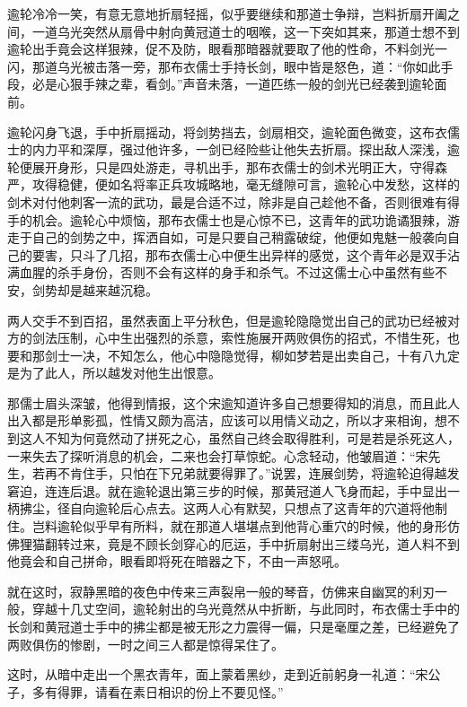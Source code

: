 逾轮冷冷一笑，有意无意地折扇轻摇，似乎要继续和那道士争辩，岂料折扇开阖之间，一道乌光突然从扇骨中射向黄冠道士的咽喉，这一下突如其来，那道士想不到逾轮出手竟会这样狠辣，促不及防，眼看那暗器就要取了他的性命，不料剑光一闪，那道乌光被击落一旁，那布衣儒士手持长剑，眼中皆是怒色，道：“你如此手段，必是心狠手辣之辈，看剑。”声音未落，一道匹练一般的剑光已经袭到逾轮面前。

逾轮闪身飞退，手中折扇摇动，将剑势挡去，剑扇相交，逾轮面色微变，这布衣儒士的内力平和深厚，强过他许多，一剑已经险些让他失去折扇。探出敌人深浅，逾轮便展开身形，只是四处游走，寻机出手，那布衣儒士的剑术光明正大，守得森严，攻得稳健，便如名将率正兵攻城略地，毫无缝隙可言，逾轮心中发愁，这样的剑术对付他刺客一流的武功，最是合适不过，除非是自己趁他不备，否则很难有得手的机会。逾轮心中烦恼，那布衣儒士也是心惊不已，这青年的武功诡谲狠辣，游走于自己的剑势之中，挥洒自如，可是只要自己稍露破绽，他便如鬼魅一般袭向自己的要害，只斗了几招，那布衣儒士心中便生出异样的感觉，这个青年必是双手沾满血腥的杀手身份，否则不会有这样的身手和杀气。不过这儒士心中虽然有些不安，剑势却是越来越沉稳。

两人交手不到百招，虽然表面上平分秋色，但是逾轮隐隐觉出自己的武功已经被对方的剑法压制，心中生出强烈的杀意，索性施展开两败俱伤的招式，不惜生死，也要和那剑士一决，不知怎么，他心中隐隐觉得，柳如梦若是出卖自己，十有八九定是为了此人，所以越发对他生出恨意。

那儒士眉头深皱，他得到情报，这个宋逾知道许多自己想要得知的消息，而且此人出入都是形单影孤，性情又颇为高洁，应该可以用情义动之，所以才来相询，想不到这人不知为何竟然动了拼死之心，虽然自己终会取得胜利，可是若是杀死这人，一来失去了探听消息的机会，二来也会打草惊蛇。心念轻动，他皱眉道：“宋先生，若再不肯住手，只怕在下兄弟就要得罪了。”说罢，连展剑势，将逾轮迫得越发窘迫，连连后退。就在逾轮退出第三步的时候，那黄冠道人飞身而起，手中显出一柄拂尘，径自向逾轮后心点去。这两人心有默契，只想点了这青年的穴道将他制住。岂料逾轮似乎早有所料，就在那道人堪堪点到他背心重穴的时候，他的身形仿佛狸猫翻转过来，竟是不顾长剑穿心的厄运，手中折扇射出三缕乌光，道人料不到他竟会和自己拼命，眼看即将死在暗器之下，不由一声怒吼。

就在这时，寂静黑暗的夜色中传来三声裂帛一般的琴音，仿佛来自幽冥的利刃一般，穿越十几丈空间，逾轮射出的乌光竟然从中折断，与此同时，布衣儒士手中的长剑和黄冠道士手中的拂尘都是被无形之力震得一偏，只是毫厘之差，已经避免了两败俱伤的惨剧，一时之间三人都是惊得呆住了。

这时，从暗中走出一个黑衣青年，面上蒙着黑纱，走到近前躬身一礼道：“宋公子，多有得罪，请看在素日相识的份上不要见怪。”

